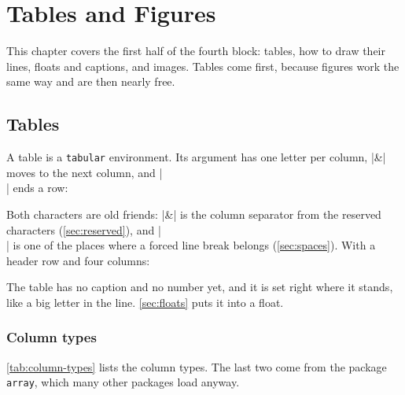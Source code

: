 \chapter{Tables and Figures}\label{chap:tables-figures}

This chapter covers the first half of the fourth block:
tables, how to draw their lines, floats and captions, and images.
Tables come first, because figures work the same way and are then nearly free.

\section{Tables}\label{sec:tables}

A table is a \texttt{tabular} environment.
Its argument has one letter per column, \code|&| moves to the next column, and \code|\\| ends a row:


Both characters are old friends:
\code|&| is the column separator from the reserved characters (\autoref{sec:reserved}),
and \code|\\| is one of the places where a forced line break belongs (\autoref{sec:spaces}).
With a header row and four columns:


The table has no caption and no number yet, and it is set right where it stands, like a big letter in the line.
\autoref{sec:floats} puts it into a float.

\subsection{Column types}\label{sec:column-types}

\autoref{tab:column-types} lists the column types.
The last two come from the package \texttt{array}, which many other packages load anyway.

